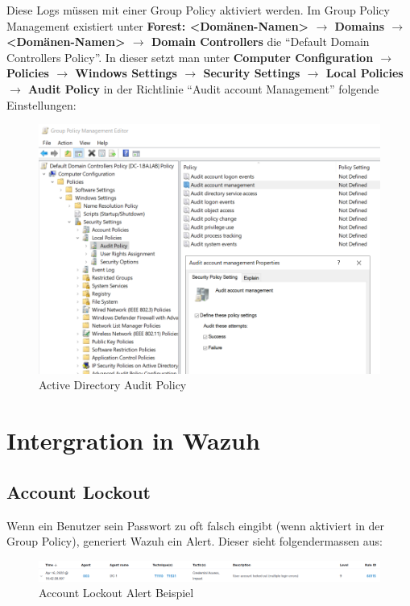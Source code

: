 Diese Logs müssen mit einer Group Policy aktiviert werden.
Im Group Policy Management existiert unter \textbf{Forest: <Domänen-Namen> $\rightarrow$ Domains $\rightarrow$ <Domänen-Namen> $\rightarrow$ Domain Controllers} die ``Default Domain Controllers Policy''.
In dieser setzt man unter \textbf{Computer Configuration $\rightarrow$ Policies $\rightarrow$ Windows Settings $\rightarrow$ Security Settings $\rightarrow$ Local Policies $\rightarrow$ Audit Policy} in der Richtlinie ``Audit account Management'' folgende Einstellungen:\\
\begin{figure}[H]
    \centering
    \includegraphics[width=0.7\linewidth]{../img/IAM/ad-account-management.png}
    \caption{Active Directory Audit Policy}
\end{figure}

\section{Intergration in Wazuh}
\subsection{Account Lockout}
Wenn ein Benutzer sein Passwort zu oft falsch eingibt (wenn aktiviert in der Group Policy), generiert Wazuh ein Alert.
Dieser sieht folgendermassen aus:
\begin{figure}[H]
    \centering
    \includegraphics[width=\linewidth]{../img/IAM/account-lockout.png}
    \caption{Account Lockout Alert Beispiel}
\end{figure}

